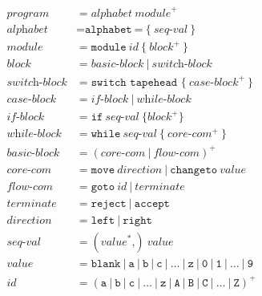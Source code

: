 \documentclass{article}
\theoremstyle{definition}
\begin{document}
    \begin{align*}
        \textit{program} &= \textit{alphabet} \ \textit{module}^+ \\
        \textit{alphabet} &= \texttt{alphabet} \ \texttt{=} \ \texttt{\{} \ \textit{seq-val} \ \texttt{\}} \\
        \textit{module} &= \texttt{module} \ \textit{id} \ \texttt{\{} \ \textit{block}^+ \ \texttt{\}} \\
        \textit{block} &= \textit{basic-block} \ | \ \textit{switch-block} \\
        \textit{switch-block} &= \texttt{switch tapehead \{} \ \textit{case-block}^+ \ \texttt{\}} \\
        \textit{case-block} &= \textit{if-block} \ | \ \textit{while-block} \\
        \textit{if-block} &= \texttt{if} \ \textit{seq-val} \ \texttt{\{} \textit{block}^+ \texttt{\}} \\
        \textit{while-block} &= \texttt{while} \ \textit{seq-val} \ \texttt{\{} \ \textit{core-com}^+ \ \texttt{\}} \\
        \textit{basic-block} &= (\textit{core-com} \ | \ \textit{flow-com})^+ \\
        \textit{core-com} &= \texttt{move} \ \textit{direction} \ | \ \texttt{changeto} \ \textit{value} \\
        \textit{flow-com} &= \texttt{goto} \ \textit{id} \ | \ \textit{terminate} \\
        \textit{terminate} &= \texttt{reject} \ | \ \texttt{accept} \\
        \textit{direction} &= \texttt{left} \ | \ \texttt{right} \\
        \textit{seq-val} &= (\textit{value}^* \texttt{,}) \ \textit{value} \\
        \textit{value} &= \texttt{blank} \ | \ \texttt{a} \ | \ \texttt{b} \ | \ \texttt{c} \ | \ \dots \ | \ \texttt{z} \ | \ \texttt{0} \ | \ \texttt{1} \ | \ \dots \ | \ \texttt{9} \\
        \textit{id} &= (\texttt{a} \ | \ \texttt{b} \ | \ \texttt{c} \ | \ \dots \ | \ \texttt{z} \ | \ \texttt{A} \ | \ \texttt{B} \ | \ \texttt{C} \ | \ \dots \ | \ \texttt{Z})^+
    \end{align*}
    
\end{document}
